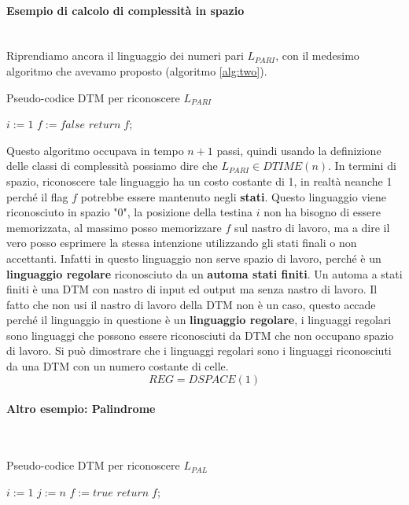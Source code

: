 \documentclass{article}
\begin{document}
\paragraph{Esempio di calcolo di complessità in spazio}\mbox{}\\
Riprendiamo ancora il linguaggio dei numeri pari $L_{PARI}$, con il medesimo
algoritmo che avevamo proposto (algoritmo \ref{alg:two}).\newline\newline
\begin{algorithm}[hbt!]
    \caption{Pseudo-codice DTM per riconoscere $L_{PARI}$}\label{alg:two}
    $i:=1$\;
    $f:=false$\;
    $return\;f;$
\end{algorithm}
Questo algoritmo occupava in tempo $n+1$ passi, quindi usando la definizione delle
classi di complessità possiamo dire che $L_{PARI}\in DTIME(n)$. In termini di spazio,
riconoscere tale linguaggio ha un costo costante di 1, in realtà neanche 1 perché
il flag $f$ potrebbe essere mantenuto negli \textbf{stati}. Questo linguaggio viene riconosciuto
in spazio "$0$", la posizione della testina $i$ non ha bisogno di essere memorizzata,
al massimo posso memorizzare $f$ sul nastro di lavoro, ma a dire il vero posso
esprimere la stessa intenzione utilizzando gli stati finali o non accettanti.
\newline\newline
Infatti in questo linguaggio non serve spazio di lavoro, perché è un \textbf{linguaggio regolare}
riconosciuto da un \textbf{automa stati finiti}. Un automa a stati finiti è una DTM
con nastro di input ed output ma senza nastro di lavoro.
\newline\newline
Il fatto che non usi il nastro di lavoro della DTM non è un caso, questo accade
perché il linguaggio in questione è un \textbf{linguaggio regolare}, i linguaggi regolari sono
linguaggi che possono essere riconosciuti da DTM che non occupano spazio di lavoro. Si può
dimostrare che i linguaggi regolari sono i linguaggi riconosciuti da una DTM con
un numero costante di celle.
$$REG=DSPACE(1)$$
\paragraph{Altro esempio: Palindrome}\mbox{}\\
\begin{algorithm}[hbt!]
    \caption{Pseudo-codice DTM per riconoscere $L_{PAL}$}\label{alg:pal}
    $i:=1$\;
    $j:=n$\;
    $f:=true$\;
    $return\;f;$
\end{algorithm}
\end{document}
